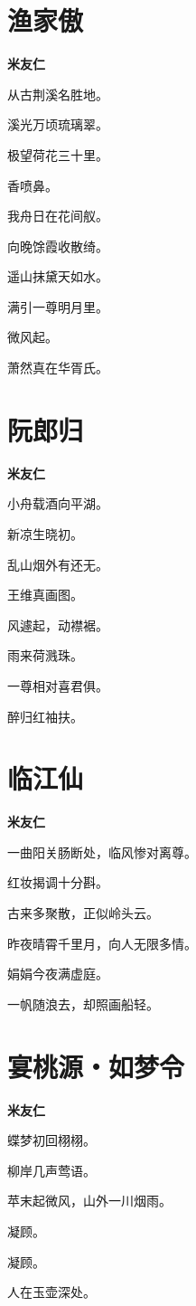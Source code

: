 \documentclass[12pt,a4paper]{ctexbook}
\begin{document}
\section{渔家傲}
\textbf{米友仁}\par\vspace{0.5em}
从古荆溪名胜地。\par
溪光万顷琉璃翠。\par
极望荷花三十里。\par
香喷鼻。\par
我舟日在花间舣。\par
向晚馀霞收散绮。\par
遥山抹黛天如水。\par
满引一尊明月里。\par
微风起。\par
萧然真在华胥氏。\par

\section{阮郎归}
\textbf{米友仁}\par\vspace{0.5em}
小舟载酒向平湖。\par
新凉生晓初。\par
乱山烟外有还无。\par
王维真画图。\par
风遽起，动襟裾。\par
雨来荷溅珠。\par
一尊相对喜君俱。\par
醉归红袖扶。\par

\section{临江仙}
\textbf{米友仁}\par\vspace{0.5em}
一曲阳关肠断处，临风惨对离尊。\par
红妆揭调十分斟。\par
古来多聚散，正似岭头云。\par
昨夜晴霄千里月，向人无限多情。\par
娟娟今夜满虚庭。\par
一帆随浪去，却照画船轻。\par

\section{宴桃源・如梦令}
\textbf{米友仁}\par\vspace{0.5em}
蝶梦初回栩栩。\par
柳岸几声莺语。\par
苹末起微风，山外一川烟雨。\par
凝顾。\par
凝顾。\par
人在玉壶深处。\par
\end{document}
